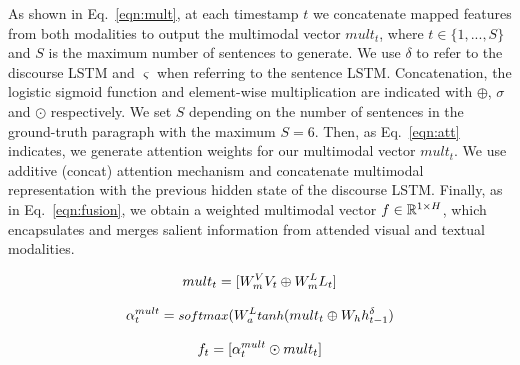 \documentclass[11pt,a4paper]{article}
\newcommand{\R}{\mathbb{R}}
\begin{document}
As shown in Eq.~\ref{eqn:mult}, at each timestamp $t$ we concatenate mapped features from both modalities to output the multimodal vector $mult_t$, where $t \in \{1, ..., S\}$ and $S$ is the maximum number of sentences to generate.
We use $\delta$ to refer to the discourse LSTM and $\varsigma$ when referring to the sentence LSTM.
Concatenation, the logistic sigmoid function and element-wise multiplication are indicated with $\oplus$, $\sigma$ and $\odot$ respectively.
We set $S$ depending on the number of sentences in the ground-truth paragraph with the maximum $S=6$. %
Then, as Eq.~\ref{eqn:att} indicates, we generate attention weights for our multimodal vector $mult_t$.
We use additive (concat) attention mechanism and concatenate multimodal representation with the previous hidden state of the discourse LSTM.
Finally, as in Eq.~\ref{eqn:fusion}, we obtain a weighted multimodal vector $f \in \R\sp{1 \times H}$, which encapsulates and merges salient information from attended visual and textual modalities.

\begin{equation}
	mult_t = [W_{m}\sp{V} V_t \oplus W_{m}\sp{L} L_t]
\label{eqn:mult}
\end{equation}

\begin{equation}
  \alpha_t\sp{mult} = \text{\small $softmax$}( W_a\sp{L} \text{\small $tanh$} (mult_t \oplus W_h h\sp{\delta}_{t-1})
\label{eqn:att}
\end{equation}

\begin{equation}
	f_t = [ \alpha_t\sp{mult} \odot mult_t ]
\label{eqn:fusion}
\end{equation}

\end{document}
